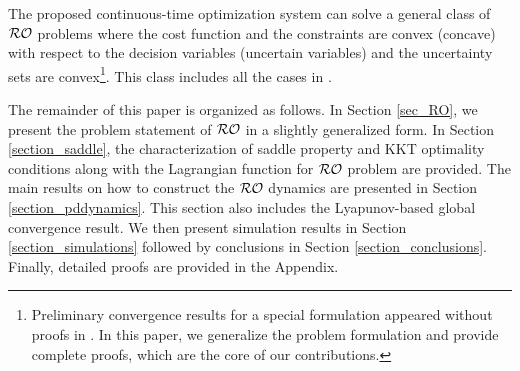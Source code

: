 \documentclass[journal,twoside,web]{ieeecolor}
\newcommand{\rev}[1]{#1}
\begin{document}





The proposed continuous-time optimization system can solve a general class of ${\cal RO}$ problems where the cost function and the constraints are convex (concave) with respect to the decision variables (uncertain variables) and the uncertainty sets are convex\footnote{Preliminary convergence results for a special formulation appeared without proofs in \cite{ebrahimi2019continuous}. In this paper, we generalize the problem formulation and provide complete proofs, which are the core of our contributions.}. This class includes all the cases in \cite[~Table 1]{gorissen20152}.

The remainder of this paper is organized as follows. In Section \ref{sec_RO}, we present the problem statement of ${\cal RO}$ in a slightly generalized form. In Section \ref{section_saddle}, the characterization of saddle property and KKT optimality conditions along with the Lagrangian function for ${\cal RO}$ problem are provided. The main results on how to construct the ${\cal RO}$ dynamics \rev{are} presented in Section \ref{section_pddynamics}. This section also includes the Lyapunov-based global convergence result. We then present simulation results in Section \ref{section_simulations} followed by conclusions in Section \ref{section_conclusions}.
Finally, detailed proofs are \rev{provided} in the Appendix.
\end{document}
